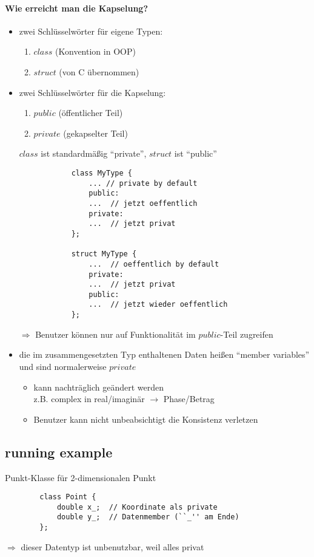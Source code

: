 \documentclass{article}
\begin{document}
	\paragraph{Wie erreicht man die Kapselung?}
	\begin{itemize}
		\item zwei Schlüsselwörter für eigene Typen: 
		\begin{enumerate}
			\item $class$ (Konvention in OOP)
			\item $struct$ (von C übernommen)
		\end{enumerate}
		\item zwei Schlüsselwörter für die Kapselung:
		\begin{enumerate}
			\item $public$ (öffentlicher Teil)
			\item $private$ (gekapselter Teil)
		\end{enumerate}
		$class$ ist standardmäßig ``private'', $struct$ ist ``public''
		\begin{lstlisting}
			class MyType {
				... // private by default
				public:
				...  // jetzt oeffentlich
				private:
				...  // jetzt privat
			};

			struct MyType {
				...  // oeffentlich by default
				private:
				...  // jetzt privat
				public:
				...  // jetzt wieder oeffentlich
			};
		\end{lstlisting}
		$\Rightarrow $ Benutzer können nur auf Funktionalität im $public$-Teil zugreifen
		\item die im zusammengesetzten Typ enthaltenen Daten heißen ``member variables'' und sind normalerweise $private$ 
		\begin{itemize}
			\item kann nachträglich geändert werden \\
			z.B. complex in real/imaginär $\rightarrow $ Phase/Betrag
			\item Benutzer kann nicht unbeabsichtigt die Konsistenz verletzen
		\end{itemize}
	\end{itemize}
\subsection{running example}
	  Punkt-Klasse für 2-dimensionalen Punkt

	 \begin{lstlisting}
	  	class Point {
	  		double x_;  // Koordinate als private
	  		double y_;  // Datenmember (``_'' am Ende)
	  	};
	 \end{lstlisting}
	  $\Rightarrow $ dieser Datentyp ist unbenutzbar, weil alles privat
\end{document}
